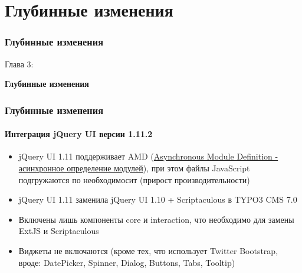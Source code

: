 %

\section{Глубинные изменения}
\begin{frame}[fragile]
	\frametitle{Глубинные изменения}

	\begin{center}\huge{Глава 3:}\end{center}
	\begin{center}\huge{\color{typo3darkgrey}\textbf{Глубинные изменения}}\end{center}

\end{frame}


\begin{frame}[fragile]
	\frametitle{Глубинные изменения}
	\framesubtitle{Интеграция jQuery UI версии 1.11.2}

	\begin{itemize}
		\item jQuery UI 1.11 поддерживает AMD
			(\href{http://en.wikipedia.org/wiki/Asynchronous_module_definition}{Asynchronous Module Definition - асинхронное
			определение модулей}), при этом файлы JavaScript подгружаются по необходимосит (прирост производительности)

    	\item jQuery UI 1.11 заменила jQuery UI 1.10 + Scriptaculous в TYPO3 CMS 7.0

    	\item Включены лишь компоненты core и interaction, что необходимо для замены ExtJS и Scriptaculous

    	\item Виджеты не включаются (кроме тех, что использует Twitter Bootstrap, вроде: DatePicker, Spinner, Dialog, Buttons, Tabs, Tooltip)

	\end{itemize}

\end{frame}

